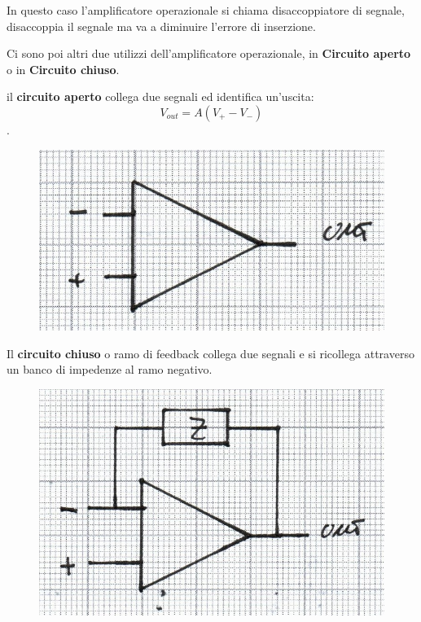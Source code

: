 \documentclass[a4paper, 15pt]{article}
\begin{document}
\begin{adjustwidth}{2in}{}
   		In questo caso l'amplificatore operazionale si chiama disaccoppiatore di segnale, disaccoppia il segnale ma va a diminuire l'errore di inserzione. \newline 
   		
   		Ci sono poi altri due utilizzi dell'amplificatore operazionale, in \textbf{Circuito aperto} o in \textbf{Circuito chiuso}.
   		
   		il \textbf{circuito aperto} collega due segnali ed identifica un'uscita: \[V_{out} = A(V_+-V_-)\].  
\begin{figure}[H]
	\centering
	\includegraphics[width=0.2\linewidth]{immagini/mm(4)}
	\label{fig:mm4}
\end{figure}   		
   		Il \textbf{circuito chiuso} o ramo di feedback collega due segnali e si ricollega attraverso un banco di impedenze al ramo negativo.
   		\begin{figure}[H]
   			\centering
   			\includegraphics[width=0.2\linewidth]{immagini/mm(5)}
   			\label{fig:mm5}
   		\end{figure}
\end{adjustwidth}
\end{document}
